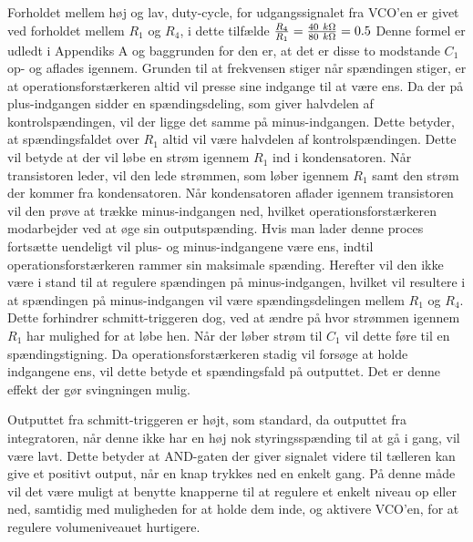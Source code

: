 Forholdet mellem høj og lav, duty-cycle, for udgangssignalet fra VCO'en er givet ved forholdet mellem $R_1$ og $R_4$, i dette tilfælde $\frac{R_4}{R_1} = \frac{40~k\ohm}{80~k\ohm}=0.5$ Denne formel er udledt i Appendiks A og baggrunden for den er, at det er disse to modstande $C_1$ op- og aflades igennem. Grunden til at frekvensen stiger når spændingen stiger, er at operationsforstærkeren altid vil presse sine indgange til at være ens. Da der på plus-indgangen sidder en spændingsdeling, som giver halvdelen af kontrolspændingen, vil der ligge det samme på minus-indgangen. Dette betyder, at spændingsfaldet over $R_1$ altid vil være halvdelen af kontrolspændingen. Dette vil betyde at der vil løbe en strøm igennem $R_1$ ind i kondensatoren. Når transistoren leder, vil den lede strømmen, som løber igennem $R_1$ samt den strøm der kommer fra kondensatoren. Når kondensatoren aflader igennem transistoren vil den prøve at trække minus-indgangen ned, hvilket operationsforstærkeren modarbejder ved at øge sin outputspænding. Hvis man lader denne proces fortsætte uendeligt vil plus- og minus-indgangene være ens, indtil operationsforstærkeren rammer sin maksimale spænding. Herefter vil den ikke være i stand til at regulere spændingen på minus-indgangen, hvilket vil resultere i at spændingen på minus-indgangen vil være spændingsdelingen mellem $R_1$ og $R_4$. Dette forhindrer schmitt-triggeren dog, ved at ændre på hvor strømmen igennem $R_1$ har mulighed for at løbe hen. Når der løber strøm til $C_1$ vil dette føre til en spændingstigning. Da operationsforstærkeren stadig vil forsøge at holde indgangene ens, vil dette betyde et spændingsfald på outputtet. Det er denne effekt der gør svingningen mulig.

Outputtet fra schmitt-triggeren er højt, som standard, da outputtet fra integratoren, når denne ikke har en høj nok styringsspænding til at gå i gang, vil være lavt. Dette betyder at AND-gaten der giver signalet videre til tælleren kan give et positivt output, når en knap trykkes ned en enkelt gang. På denne måde vil det være muligt at benytte knapperne til at regulere et enkelt niveau op eller ned, samtidig med muligheden for at holde dem inde, og aktivere VCO'en, for at regulere volumeniveauet hurtigere.




